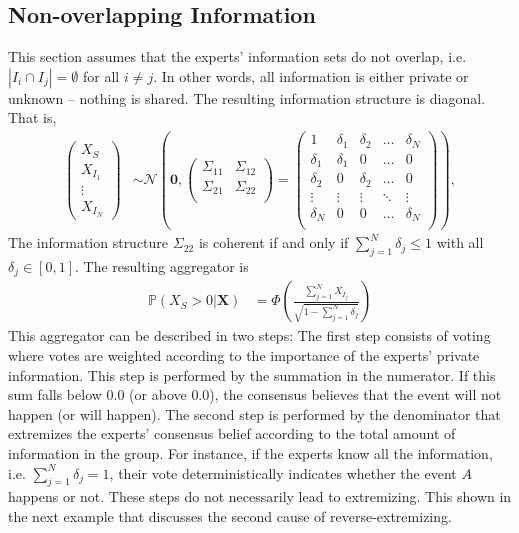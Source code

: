 \documentclass[11pt]{article}
\renewcommand{\P}{\mathbb{P}}
\theoremstyle{definition}
\theoremstyle{definition}
\begin{document}
\subsection{Non-overlapping Information}
\label{nonoverlap}
This section assumes that the experts' information sets do not overlap, i.e.   $|I_{i} \cap I_{j}| = \emptyset$ for all $i \neq j$. In other words, all information is either private or unknown -- nothing is shared. The resulting information structure is diagonal.  That is,
\begin{align*}
\left(\begin{matrix} X_{S} \\ X_{I_1}\\ \vdots \\ X_{I_N} \end{matrix}\right) &\sim \mathcal{N}\left( 
 \boldsymbol{0}, \left(\begin{matrix} 
\Sigma_{11} & \Sigma_{12}\\
\Sigma_{21} & \Sigma_{22}\\
 \end{matrix}\right) 
 =
 \left(\begin{array}{c|cccc}
1 & \delta_1 & \delta_2 & \dots & \delta_N  \\ \hline
\delta_1 & \delta_1 &0 & \dots & 0   \\ 
\delta_2 & 0 & \delta_2 & \dots & 0  \\ 
\vdots & \vdots & \vdots & \ddots & \vdots  \\ 
\delta_N & 0 & 0 & \dots & \delta_N\\ 
 \end{array}\right)\right),
\end{align*}
The information structure $\Sigma_{22}$  is coherent if and only if $\sum_{j=1}^N \delta_j \leq 1$ with all $\delta_j \in [0,1]$. The resulting aggregator is 
\begin{align}
\P\left(X_{S} > 0 | \boldsymbol{X}\right) &= \Phi\left( \frac{\sum_{j=1}^N X_{I_j}}{\sqrt{1 - \sum_{j=1}^N \delta_j}}\right) \label{VotingAggre}
\end{align}
This aggregator can be described in two steps: The first step consists of voting where votes are weighted according to the importance of the experts' private information. This step is performed by the summation in the numerator. If this sum falls below $0.0$ (or above $0.0$), the consensus believes that the event will not happen (or will happen). The second step is performed by the denominator that extremizes the experts'  consensus belief according to the total amount of information in the group. For instance, if the experts know all the information, i.e. $\sum_{j=1}^N \delta_j = 1$, their vote deterministically indicates whether the event $A$ happens or not. These steps do not necessarily lead to extremizing. This shown in the next example that discusses the second cause of reverse-extremizing.
\end{document}
